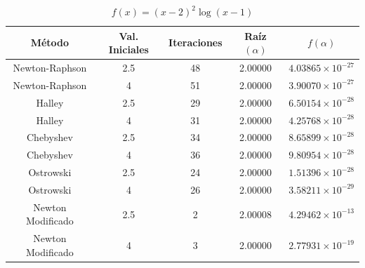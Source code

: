 \begin{table}[H]
\centering

\renewcommand{\arraystretch}{1.3} %
\setlength{\tabcolsep}{12pt}      %

\begin{tabular}{ccccc}
\hline
Método & Val. Iniciales & Iteraciones & Raíz $(\alpha)$ & $f(\alpha)$ \\
\hline

Newton-Raphson    & 2.5 & 48 & 2.00000 & $4.03865\times10^{-27}$ \\

Newton-Raphson    & 4   & 51 & 2.00000 & $3.90070\times10^{-27}$ \\

Halley            & 2.5 & 29 & 2.00000 & $6.50154\times10^{-28}$ \\

Halley            & 4   & 31 & 2.00000 & $4.25768\times10^{-28}$ \\

Chebyshev         & 2.5 & 34 & 2.00000 & $8.65899\times10^{-28}$ \\

Chebyshev         & 4   & 36 & 2.00000 & $9.80954\times10^{-28}$ \\

Ostrowski         & 2.5 & 24 & 2.00000 & $1.51396\times10^{-28}$ \\

Ostrowski         & 4   & 26 & 2.00000 & $3.58211\times10^{-29}$ \\

Newton Modificado & 2.5 &  2 & 2.00008 & $4.29462\times10^{-13}$ \\

Newton Modificado & 4   &  3 & 2.00000 & $2.77931\times10^{-19}$ \\

\hline
\end{tabular}

\caption{$f(x) = \left(x - 2\right)^{2} \log{\left(x - 1 \right)}$}
\end{table}


